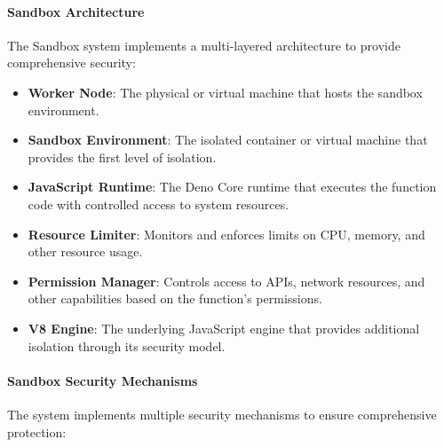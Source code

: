 \documentclass{article}
\begin{document}
\paragraph{Sandbox Architecture}
The Sandbox system implements a multi-layered architecture to provide comprehensive security:

\begin{itemize}
    \item \textbf{Worker Node}: The physical or virtual machine that hosts the sandbox environment.
    
    \item \textbf{Sandbox Environment}: The isolated container or virtual machine that provides the first level of isolation.
    
    \item \textbf{JavaScript Runtime}: The Deno Core runtime that executes the function code with controlled access to system resources.
    
    \item \textbf{Resource Limiter}: Monitors and enforces limits on CPU, memory, and other resource usage.
    
    \item \textbf{Permission Manager}: Controls access to APIs, network resources, and other capabilities based on the function's permissions.
    
    \item \textbf{V8 Engine}: The underlying JavaScript engine that provides additional isolation through its security model.
\end{itemize}

\paragraph{Sandbox Security Mechanisms}
The system implements multiple security mechanisms to ensure comprehensive protection:
\end{document}
